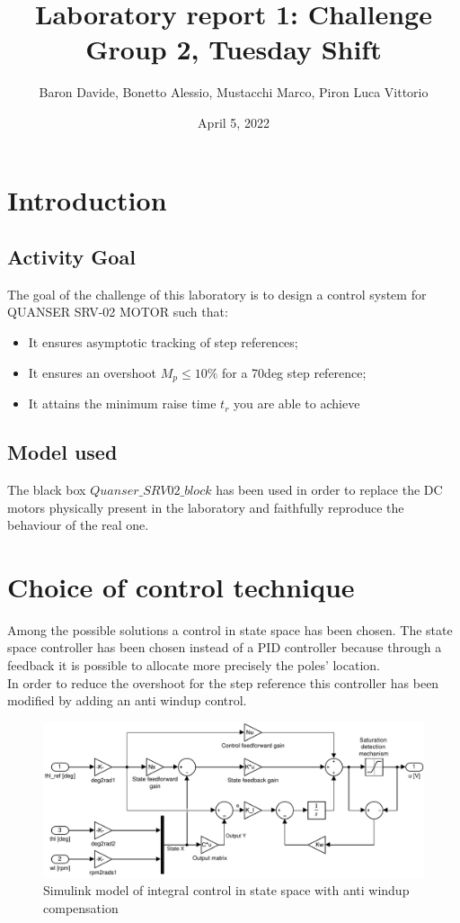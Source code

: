 \documentclass[11pt]{article}
\title{
	{\Large Laboratory report 1: Challenge \\
	 \large Group 2, Tuesday Shift}
}
\author{Baron Davide, Bonetto Alessio, Mustacchi Marco, Piron Luca Vittorio}
\date{April 5, 2022}
\begin{document}
\maketitle

\section{Introduction}

	\subsection{Activity Goal}
	The goal of the challenge of this laboratory is to design a control system for QUANSER SRV-02 MOTOR such that:

	\begin{itemize}
		\item It ensures asymptotic tracking of step references;
		\item It ensures an overshoot $M_p \le 10\%$ for a 70deg step reference;
		\item It attains the minimum raise time $t_r$ you are able to achieve
	\end{itemize}

	\subsection{Model used}
	The black box $\textit{Quanser\_SRV02\_block}$ has been used in order to replace the DC motors physically present in the laboratory
	and faithfully reproduce the behaviour of the real one.

\section{Choice of control technique}

Among the possible solutions a control in state space has been chosen. 
The state space controller has been chosen instead of a PID controller because through a feedback it is possible to allocate more precisely the poles' location. \\
In order to reduce the overshoot for the step reference this controller has been modified by adding an anti windup control.
	\begin{figure}[h!]
		\centering\includegraphics[scale=0.6]{images/Simulink_challenge}
		\caption{Simulink model of integral control in state space with anti windup compensation}
	\end{figure}
\vspace{-10pt}
\end{document}
